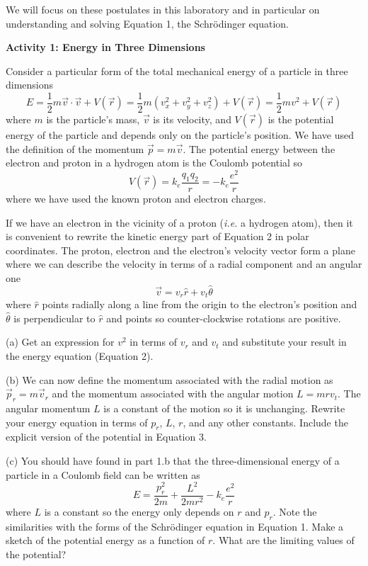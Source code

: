 \noindent We will focus on these postulates in this laboratory and in particular
on understanding and solving Equation 1, the Schr\"odinger equation.

\textbf{Activity 1: Energy in Three Dimensions}


Consider a particular form of the total
mechanical energy of a particle in three dimensions
\begin{equation}
E = \frac{1}{2} m \vec v \cdot \vec v + V(\vec r) = 
   \frac{1}{2} m (v_x^2 + v_y^2 + v_z^2) + V(\vec r) = 
   \frac{1}{2} m v^2 + V(\vec r) 
\end{equation}
where $m$ is the particle's mass, $\vec v$ is its
velocity, and  $V(\vec r)$ is the potential energy of the particle
and depends only on the particle's position.
We have used the definition of the momentum $\vec p = m \vec v$.
The potential energy between the electron and proton in a hydrogen atom is 
the Coulomb potential so
\begin{equation}
V(\vec r) = k_e \frac{q_1 q_2}{r} =  
   - k_e \frac{e^2}{r} 
\end{equation}
where we have used the known proton and electron charges.

If we have an electron in the vicinity of a proton ({\it i.e.} a hydrogen atom), then
it is convenient to rewrite the kinetic energy part of Equation 2 in polar coordinates.
The proton, electron and the electron's velocity vector 
form a plane where we can describe the velocity in terms
of a radial component and an angular one
\begin{equation}
\vec v = v_r \hat r + v_t \hat \theta
\end{equation}
where $\hat r$ points radially along a line from the origin to the electron's position
and $\hat \theta$ is perpendicular to $\hat r$ and points so counter-clockwise rotations
are positive.

(a) Get an expression for $v^2$ in terms of
$v_r$ and $v_t$ and substitute your result in the energy equation (Equation 2).
\vskip 2.0cm

(b) We can now define the momentum associated with  the radial motion
as $\vec p_r = m\vec v_r$
and the momentum associated with the angular motion $L = mrv_t$.
The angular momentum $L$ is a constant of the motion so it is unchanging.
Rewrite your energy equation in terms of $p_r$, $L$, $r$, and any other constants.
Include the explicit version of the potential in Equation 3.
\vskip 2.0cm

(c) You should have found in part 1.b that the three-dimensional
energy of a particle in a Coulomb field can be written as
\begin{equation}
E = \frac{p_r^2}{2m} + \frac{L^2}{2mr^2} - k_e\frac{e^2}{r}
\end{equation}
where $L$ is a constant so the energy only depends on $r$ and $p_r$.
Note the similarities with the forms of the Schr\"odinger equation in Equation 1.
Make a sketch of the potential energy as a function of $r$.
What are the limiting values of the potential?
\vskip 3.0cm

